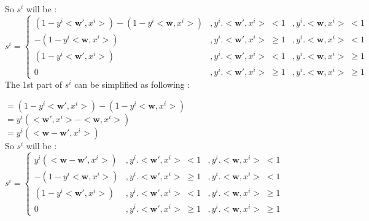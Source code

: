 \documentclass[a4paper,11pt]{article}
\begin{document}
\begin{mlsolution}
So \begin{math}s^{i}\end{math} will be :\\

\begin{math}
s^{i} = \left\{\begin{matrix}
\left ( 1 - y^{i}<\textbf{w}{}', x^{i}>  \right ) - \left ( 1 - y^{i}<\textbf{w}, x^{i}> \right ) & ,y^{i}.<\textbf{w}{}', x^{i}> \; <  1&,  y^{i}.<\textbf{w}, x^{i}> \;< 1\\ 
- \left ( 1 - y^{i}<\textbf{w}, x^{i}> \right ) & ,y^{i}.<\textbf{w}{}', x^{i}> \; \geq  1 & ,  y^{i}.<\textbf{w}, x^{i}> \;< 1\\ 
\left ( 1 - y^{i}<\textbf{w}{}', x^{i}>  \right ) & ,y^{i}.<\textbf{w}{}', x^{i}> \; <  1 & ,  y^{i}.<\textbf{w}, x^{i}> \; \geq 1\\ 
0 & ,y^{i}.<\textbf{w}{}', x^{i}> \; \geq  1 & ,  y^{i}.<\textbf{w}, x^{i}> \; \geq 1
\end{matrix}\right.
\end{math}\\

The 1st part of \begin{math}s^{i}\end{math} can be simplified as following :

\begin{math}
=\left ( 1 - y^{i}<\textbf{w}{}', x^{i}>  \right ) - \left ( 1 - y^{i}<\textbf{w}, x^{i}> \right )\end{math}\\

\begin{math}= y^{i} \left (  <\textbf{w}{}', x^{i}> - <\textbf{w}, x^{i}>\right )\end{math}\\

\begin{math}= y^{i} \left (<\textbf{w} -\textbf{w}{}', x^{i}>\right )\end{math}\\

So \begin{math}s^{i}\end{math} will be :\\

\begin{math}
s^{i} = \left\{\begin{matrix}
y^{i} \left (<\textbf{w} -\textbf{w}{}', x^{i}>\right ) & ,y^{i}.<\textbf{w}{}', x^{i}> \; <  1&,  y^{i}.<\textbf{w}, x^{i}> \;< 1\\ 
- \left ( 1 - y^{i}<\textbf{w}, x^{i}> \right ) & ,y^{i}.<\textbf{w}{}', x^{i}> \; \geq  1 & ,  y^{i}.<\textbf{w}, x^{i}> \;< 1\\ 
\left ( 1 - y^{i}<\textbf{w}{}', x^{i}>  \right ) & ,y^{i}.<\textbf{w}{}', x^{i}> \; <  1 & ,  y^{i}.<\textbf{w}, x^{i}> \; \geq 1\\ 
0 & ,y^{i}.<\textbf{w}{}', x^{i}> \; \geq  1 & ,  y^{i}.<\textbf{w}, x^{i}> \; \geq 1
\end{matrix}\right.
\end{math}\\


\end{mlsolution}
\end{document}
